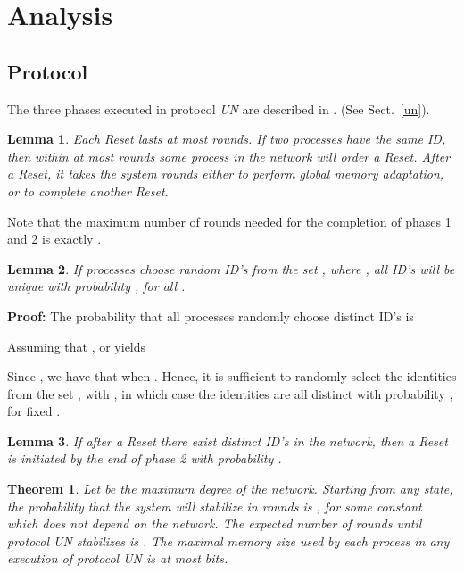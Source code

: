 \documentclass[10pt]{article}
\newtheorem{thm}{Theorem}[section]
\newtheorem{lemm}{Lemma}[section]
\newenvironment{proof}{\begin{trivlist}
                       \item[]\hspace{0cm}\textbf{Proof: }
                       \hspace{0cm} }{\hfill 
                       \end{trivlist}}
\begin{document}
\section{Analysis}\label{anal}

\subsection{Protocol }
The three phases executed in protocol {\em UN} are described in
\cite{AnEH92,BuBL95}. (See Sect.~\ref{un}).

\begin{lemm}\label{lem:rounds}
Each Reset lasts at most  rounds. If two processes have the
same ID, then within at most  rounds some process in the network
will order a Reset. After a Reset, it takes the system  rounds
either to perform global memory adaptation, or to complete another
Reset.
\end{lemm}
Note that the maximum number of rounds needed for the completion of phases
1 and 2 is exactly .
\begin{lemm}\label{lem:ID's}
If  processes choose random ID's from the set ,
where , all ID's will be unique with probability
, for all .
\end{lemm}

\begin{proof}
The probability  that all processes randomly choose distinct ID's is

Assuming that , or  yields

Since , we
have that  when . Hence,
it is sufficient to randomly select the  identities from the set ,
with , in which case the identities are all
distinct with probability , for fixed .
\end{proof}

\begin{lemm}\label{lem:reset}
If after a Reset there exist  distinct ID's in the network, then a
Reset is initiated by the end of phase 2 with probability .
\end{lemm}

\sloppypar
\begin{thm}\label{thm:unc}
Let  be the maximum degree of the network. Starting from any state,
the probability that the system will stabilize in  rounds is , for some constant
 which does not depend on the network. The expected number
of rounds until protocol UN stabilizes is . The maximal
memory size used by each process in any execution of protocol UN is at most
 bits.
\end{thm}
\end{document}
